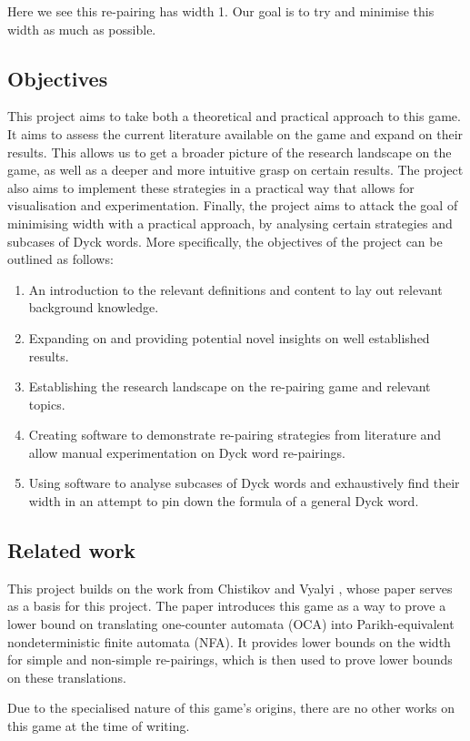 \noindent Here we see this re-pairing has width 1. Our goal is to try and minimise this width as much as possible. 


\subsection{Objectives}

This project aims to take both a theoretical and practical approach to this game. It aims to assess the current literature available on the game and expand on their results. This allows us to get a broader picture of the research landscape on the game, as well as a deeper and more intuitive grasp on certain results. The project also aims to implement these strategies in a practical way that allows for visualisation and experimentation. Finally, the project aims to attack the goal of minimising width with a practical approach, by analysing certain strategies and subcases of Dyck words. More specifically, the objectives of the project can be outlined as follows:

\begin{enumerate}
    \item An introduction to the relevant definitions and content to lay out relevant background knowledge.
    \item Expanding on and providing potential novel insights on well established results.
    \item Establishing the research landscape on the re-pairing game and relevant topics.
    \item Creating software to demonstrate re-pairing strategies from literature and allow manual experimentation on Dyck word re-pairings.
    \item Using software to analyse subcases of Dyck words and exhaustively find their width in an attempt to pin down the formula of a general Dyck word.
\end{enumerate}

\subsection{Related work}
This project builds on the work from Chistikov and Vyalyi \cite{chistikov2020re}, whose paper serves as a basis for this project. The paper introduces this game as a way to prove a lower bound on translating one-counter automata (OCA) into Parikh-equivalent nondeterministic finite automata (NFA). It provides lower bounds on the width for simple and non-simple re-pairings, which is then used to prove lower bounds on these translations.

Due to the specialised nature of this game's origins, there are no other works on this game at the time of writing.

